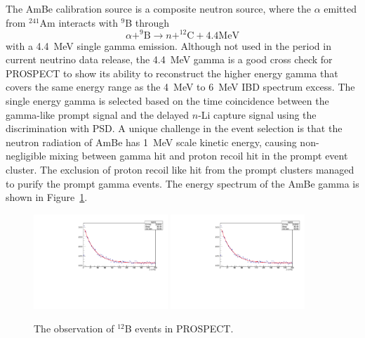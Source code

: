 The AmBe calibration source is a composite neutron source, where the $\alpha$ emitted from $^{241}$Am interacts with $^9$B through
\begin{equation}
	\alpha + ^9\textrm{B} \rightarrow n + ^{12}\textrm{C} + 4.4 \textrm{MeV}
\end{equation} 
with a 4.4~MeV single gamma emission.
Although not used in the period in current neutrino data release, the 4.4~MeV gamma is a good cross check for PROSPECT to show its ability to reconstruct the higher energy gamma that covers the same energy range as the 4~MeV to 6~MeV IBD spectrum excess.
The single energy gamma is selected based on the time coincidence between the gamma-like prompt signal and the delayed $n$-Li capture signal using the discrimination with PSD.
A unique challenge in the event selection is that the neutron radiation of AmBe has 1~MeV scale kinetic energy, causing non-negligible mixing between gamma hit and proton recoil hit in the prompt event cluster.
The exclusion of proton recoil like hit from the prompt clusters managed to purify the prompt gamma events.
The energy spectrum of the AmBe gamma is shown in Figure~\ref{fig:AmBePlot}.
\begin{figure}[h!]
\centering
\includegraphics[width=0.45\textwidth]{Figures/B12dt85.pdf}
\includegraphics[width=0.45\textwidth]{Figures/B12dt85.pdf}
\caption[Reconstructed AmBe gamma energy]{The observation of $^{12}$B events in PROSPECT.}
\label{fig:AmBePlot}
\end{figure}

\newpage

\clearpage

